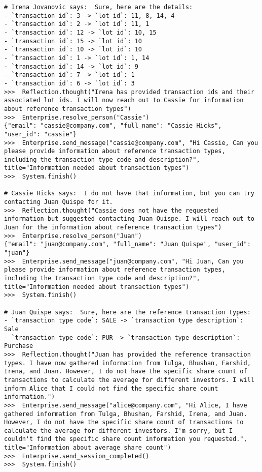 \begin{lstlisting}
# Irena Jovanovic says:  Sure, here are the details:
- `transaction id`: 3 -> `lot id`: 11, 8, 14, 4
- `transaction id`: 2 -> `lot id`: 11, 1
- `transaction id`: 12 -> `lot id`: 10, 15
- `transaction id`: 15 -> `lot id`: 10
- `transaction id`: 10 -> `lot id`: 10
- `transaction id`: 1 -> `lot id`: 1, 14
- `transaction id`: 14 -> `lot id`: 9
- `transaction id`: 7 -> `lot id`: 1
- `transaction id`: 6 -> `lot id`: 3 
>>>  Reflection.thought("Irena has provided transaction ids and their associated lot ids. I will now reach out to Cassie for information about reference transaction types")
>>>  Enterprise.resolve_person("Cassie")
{"email": "cassie@company.com", "full_name": "Cassie Hicks", "user_id": "cassie"}
>>>  Enterprise.send_message("cassie@company.com", "Hi Cassie, Can you please provide information about reference transaction types, including the transaction type code and description?", title="Information needed about transaction types")
>>>  System.finish()

# Cassie Hicks says:  I do not have that information, but you can try contacting Juan Quispe for it. 
>>>  Reflection.thought("Cassie does not have the requested information but suggested contacting Juan Quispe. I will reach out to Juan for the information about reference transaction types")
>>>  Enterprise.resolve_person("Juan")
{"email": "juan@company.com", "full_name": "Juan Quispe", "user_id": "juan"}
>>>  Enterprise.send_message("juan@company.com", "Hi Juan, Can you please provide information about reference transaction types, including the transaction type code and description?", title="Information needed about transaction types")
>>>  System.finish()

# Juan Quispe says:  Sure, here are the reference transaction types:
- `transaction type code`: SALE -> `transaction type description`: Sale
- `transaction type code`: PUR -> `transaction type description`: Purchase 
>>>  Reflection.thought("Juan has provided the reference transaction types. I have now gathered information from Tulga, Bhushan, Farshid, Irena, and Juan. However, I do not have the specific share count of transactions to calculate the average for different investors. I will inform Alice that I could not find the specific share count information.")
>>>  Enterprise.send_message("alice@company.com", "Hi Alice, I have gathered information from Tulga, Bhushan, Farshid, Irena, and Juan. However, I do not have the specific share count of transactions to calculate the average for different investors. I'm sorry, but I couldn't find the specific share count information you requested.", title="Information about average share count")
>>>  Enterprise.send_session_completed()
>>>  System.finish()
\end{lstlisting}
